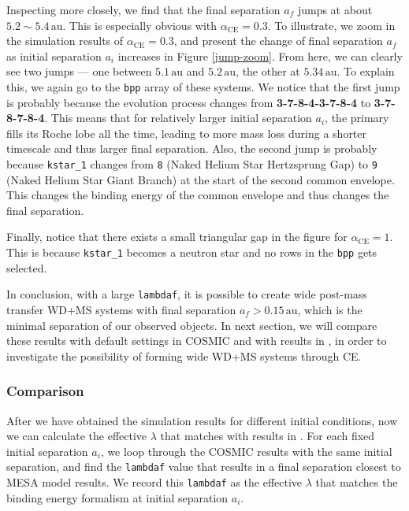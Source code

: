 \documentclass[linenumbers]{aastex631}
\newcommand{\alphace}{\alpha_{\mathrm{CE}}}
\newcommand{\au}{\, \mathrm{au}}
\begin{document}
Inspecting more closely, we find that the final separation $a_f$ jumps at about $5.2 \sim 5.4 \au$. This is especially obvious with $\alphace = 0.3$. To illustrate, we zoom in the simulation results of $\alphace = 0.3$, and present the change of final separation $a_f$ as initial separation $a_i$ increases in Figure \ref{jump-zoom}. From here, we can clearly see two jumps — one between $5.1\au$ and $5.2\au$, the other at $5.34\au$. To explain this, we again go to the \verb|bpp| array of these systems. We notice that the first jump is probably because the evolution process changes from \textbf{3-7-8-4-3-7-8-4} to \textbf{3-7-8-7-8-4}. This means that for relatively larger initial separation $a_i$, the primary fills its Roche lobe all the time, leading to more mass loss during a shorter timescale and thus larger final separation. Also, the second jump is probably because \verb|kstar_1| changes from \verb|8| (Naked Helium Star Hertzsprung Gap) to \verb|9| (Naked Helium Star Giant Branch) at the start of the second common envelope. This changes the binding energy of the common envelope and thus changes the final separation.

Finally, notice that there exists a small triangular gap in the figure for $\alphace = 1$. This is because \verb|kstar_1| becomes a neutron star and no rows in the \verb|bpp| gets selected.

In conclusion, with a large \verb|lambdaf|, it is possible to create wide post-mass transfer WD+MS systems with final separation $a_f > 0.15 \au$, which is the minimal separation of our observed objects. In next section, we will compare these results with default settings in COSMIC and with results in \cite{yamaguchi_hi}, in order to investigate the possibility of forming wide WD+MS systems through CE.

\subsubsection{Comparison}
After we have obtained the simulation results for different initial conditions, now we can calculate the effective $\lambda$ that matches with results in \cite{yamaguchi_hi}. For each fixed initial separation $a_i$, we loop through the COSMIC results with the same initial separation, and find the \verb|lambdaf| value that results in a final separation closest to MESA model results. We record this \verb|lambdaf| as the effective $\lambda$ that matches the binding energy formalism at initial separation $a_i$.
\end{document}
